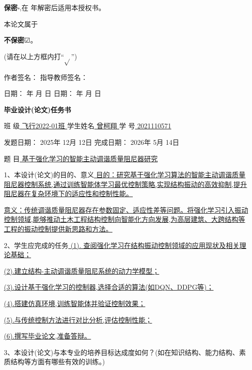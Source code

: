 \documentclass{scrbook}
\begin{document}
             \textbf{              保密}${\square}$,在   年解密后适用本授权书。

本论文属于

\textbf{                           不保密}${\CheckedBox}$。

(请在以上方框内打``\textbf{${\sqrt{}}$}'')

作者签名：                               指导教师签名：

日期：    年   月   日                   日期：    年   月   日

{\centering \textbf{毕业设计(论文)任务书}

\par}班    级\uline{  飞行2022-01班  }学生姓名\uline{  曾柯翔  }学    号\uline{  2021110571  }

发题日期：  2025年 12月 12日          完成日期：  2026年 5月 14日

题    目\uline{  基于强化学习的智能主动调谐质量阻尼器研究                        }

1、本设计(论文)的目的、意义\uline{   目的：研究基于强化学习算法的智能主动调谐质量阻尼器控制系统,通过训练智能体学习最优控制策略,实现结构振动的高效抑制,提升阻尼器在复杂环境下的适应性和控制性能。                                }

\uline{意义：传统调谐质量阻尼器存在参数固定、适应性差等问题。将强化学习引入振动控制领域,能够推动土木工程结构控制向智能化方向发展,为高层建筑、大跨结构等工程的振动控制提供新思路和方法。                                             }

2、学生应完成的任务\uline{  (1). 查阅强化学习在结构振动控制领域的应用现状及相关理论基础；                                                                      }

\uline{(2).建立结构-主动调谐质量阻尼系统的动力学模型；                                 }

\uline{(3).设计基于强化学习的控制器,选择合适的算法(如DQN、DDPG等)；                 }

\uline{(4).搭建仿真环境,训练智能体并验证控制效果；                                    }

\uline{(5).与传统控制方法进行对比分析,评估控制性能；                                 }

\uline{(6).撰写毕业论文,准备答辩。                                                    }

3、本设计(论文)与本专业的培养目标达成度如何？(如在知识结构、能力结构、素质结构等方面有哪些有效的训练。)                                                                          
\end{document}
